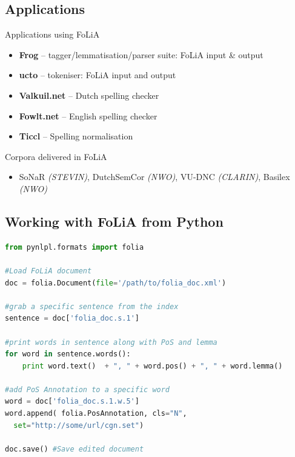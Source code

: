 \documentclass[compress]{beamer}
\begin{document}
\subsection{Applications}

\begin{frame}
	\begin{block}{Applications using FoLiA}
		\begin{itemize}
			\item \textbf{Frog} -- tagger/lemmatisation/parser suite: FoLiA input \& output
			\item \textbf{ucto} -- tokeniser: FoLiA input and output
			\item \textbf{Valkuil.net} -- Dutch spelling checker
			\item \textbf{Fowlt.net} -- English spelling checker
			\item \textbf{Ticcl} -- Spelling normalisation
		\end{itemize}
	\end{block}

	\begin{block}{Corpora delivered in FoLiA}
		\begin{itemize}
			\item SoNaR \emph{(STEVIN)}, DutchSemCor \emph{(NWO)}, VU-DNC \emph{(CLARIN)}, Basilex \emph{(NWO)}
		\end{itemize}
	\end{block}		
\end{frame}
	

\subsection{Working with FoLiA from Python}

\begin{frame}[fragile]
\footnotesize
\begin{lstlisting}[language=python]
from pynlpl.formats import folia

#Load FoLiA document
doc = folia.Document(file='/path/to/folia_doc.xml')

#grab a specific sentence from the index
sentence = doc['folia_doc.s.1']

#print words in sentence along with PoS and lemma
for word in sentence.words():
    print word.text()  + ", " + word.pos() + ", " + word.lemma()	

#add PoS Annotation to a specific word
word = doc['folia_doc.s.1.w.5']
word.append( folia.PosAnnotation, cls="N",
  set="http://some/url/cgn.set")

doc.save() #Save edited document
\end{lstlisting}
\end{frame}
\end{document}
